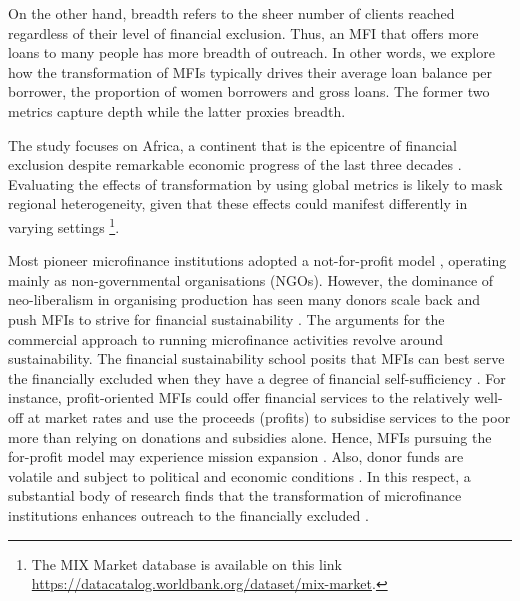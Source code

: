 \documentclass[a4paper, nobind]{templates/ociamthesis}
\begin{document}
On the other hand, breadth refers to the sheer number of clients reached regardless of their level of financial exclusion. Thus, an MFI that offers more loans to many people has more breadth of outreach. In other words, we explore how the transformation of MFIs typically drives their average loan balance per borrower, the proportion of women borrowers and gross loans. The former two metrics capture depth while the latter proxies breadth.

The study focuses on Africa, a continent that is the epicentre of financial exclusion despite remarkable economic progress of the last three decades \autocite{beck2014sme,allen2011african}. Evaluating the effects of transformation by using global metrics is likely to mask regional heterogeneity, given that these effects could manifest differently in varying settings \autocite{d2017ngos,d2013unsubsidized} \footnote{The MIX Market database is available on this link \url{https://datacatalog.worldbank.org/dataset/mix-market}.}.

Most pioneer microfinance institutions adopted a not-for-profit model \autocite{dichter1996questioning}, operating mainly as non-governmental organisations (NGOs). However, the dominance of neo-liberalism in organising production has seen many donors scale back and push MFIs to strive for financial sustainability \autocite{bateman2010doesn}. The arguments for the commercial approach to running microfinance activities revolve around sustainability. The financial sustainability school posits that MFIs can best serve the financially excluded when they have a degree of financial self-sufficiency \autocite{kodongo2013individual}. For instance, profit-oriented MFIs could offer financial services to the relatively well-off at market rates and use the proceeds (profits) to subsidise services to the poor more than relying on donations and subsidies alone. Hence, MFIs pursuing the for-profit model may experience mission expansion \autocite{mersland2010microfinance,louis2013financial}. Also, donor funds are volatile and subject to political and economic conditions \autocite{garmaise2013cheap,d2017aid}. In this respect, a substantial body of research finds that the transformation of microfinance institutions enhances outreach to the financially excluded \autocite{frank2008stemming,gutierrez2009social,mersland2010microfinance,quayes2012depth,mia2017mission,d2013unsubsidized}.
\end{document}

